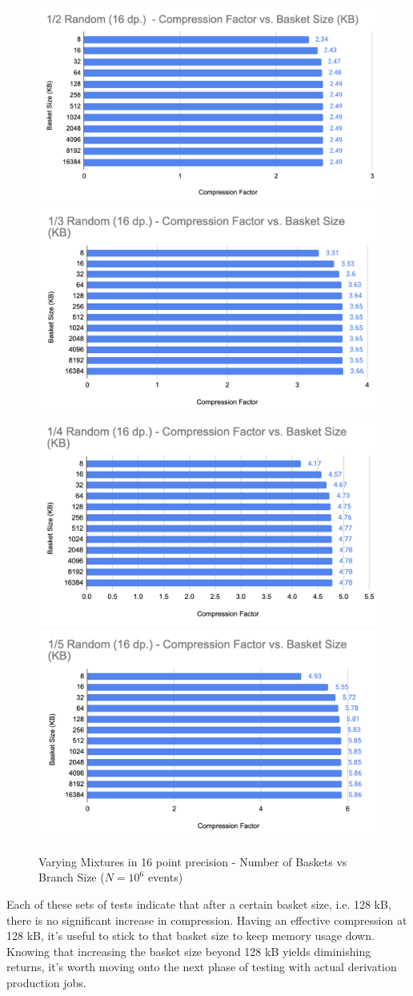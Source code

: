 \begin{figure}[h]
    \centering
    \includegraphics[width=.5\textwidth]{content/toymodel_content/4.18/1_of_2.png}
    \includegraphics[width=.5\textwidth]{content/toymodel_content/4.18/1_of_3.png}
    \includegraphics[width=.5\textwidth]{content/toymodel_content/4.18/1_of_4.png}
    \includegraphics[width=.5\textwidth]{content/toymodel_content/4.18/1_of_5.png}
    \caption{Varying Mixtures in 16 point precision - Number of Baskets vs Branch Size ($N=10^6$ events)}
    \label{fig:toymodel_418_compF_vs_basketsize}
\end{figure}

Each of these sets of tests indicate that after a certain basket size, i.e. 128 kB, there is no significant increase in compression. 
Having an effective compression at 128 kB, it's useful to stick to that basket size to keep memory usage down. 
Knowing that increasing the basket size beyond 128 kB yields diminishing returns, it's worth moving onto the next phase of testing with actual derivation production jobs.

